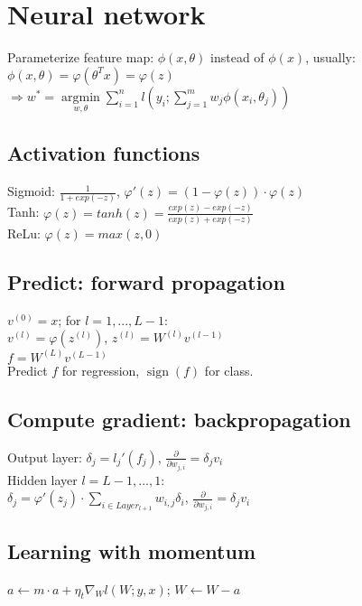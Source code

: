 \section*{Neural network}
Parameterize feature map: $\phi(x,\theta)$ instead of $\phi(x)$, usually: $\phi(x,\theta) = \varphi(\theta^T x) = \varphi(z)$\\
$\Rightarrow w^* = \underset{w, \theta}{\operatorname{argmin}} \sum_{i=1}^n l(y_i; \sum_{j=1}^m w_j \phi(x_i, \theta_j))$

\subsection*{Activation functions}
Sigmoid: $\frac{1}{1+exp(-z)}$,  $\varphi'(z) = (1 - \varphi(z))\cdot\varphi(z)$\\
Tanh: $\varphi(z) = tanh(z) = \frac{exp(z)-exp(-z)}{exp(z)+exp(-z)}$\\
ReLu:  $\varphi(z) = max(z,0)$

\subsection*{Predict: forward propagation}
$v^{(0)} = x$; for $l = 1,...,L-1$: \\
$v^{(l)} = \varphi(z^{(l)})$, $z^{(l)} = W^{(l)}v^{(l-1)}$\\
$f = W^{(L)}v^{(L-1)}$\\
Predict $f$ for regression, $\operatorname{sign}(f)$ for class.

\subsection*{Compute gradient: backpropagation}
Output layer: 
$\delta_j = l_j'(f_j)$,
$\frac{\partial}{\partial w_{j,i}} = \delta_j v_i$\\
Hidden layer $l=L-1,...,1$:\\
$\delta_j = \varphi'(z_j) \cdot \sum_{i\in Layer_{l+1}} w_{i,j}\delta_i$,
$\frac{\partial}{\partial w_{j,i}} = \delta_j v_i$

\subsection*{Learning with momentum}
$a \leftarrow m \cdot a + \eta_t \nabla_W l(W;y,x)$; $W \leftarrow W - a$